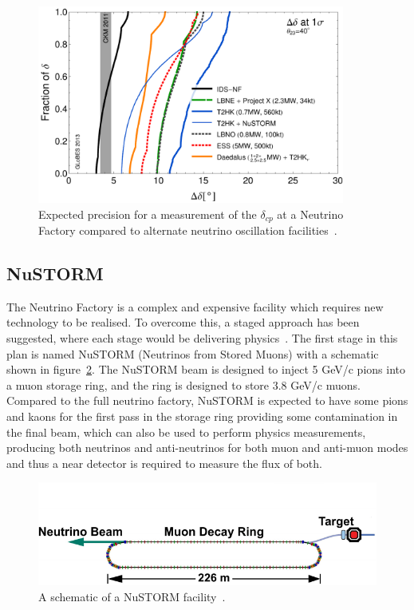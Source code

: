 \begin{figure}[h!]
\centering
\includegraphics[width=0.9\textwidth]{figures/rdr-cp-precision-comparison-131216.pdf}
\caption{Expected precision for a measurement of the $\delta_{cp}$ at a Neutrino Factory compared to alternate neutrino oscillation facilities~\cite{Fix7}.}
\label{fig:nuFactExp}
\end{figure}



\subsection{NuSTORM}\label{subsec:NuSTORM}

The Neutrino Factory is a complex and expensive facility which requires new technology to be realised. To overcome this, a staged approach has been suggested, where each stage would be delivering physics~\cite{Fix7}. The first stage in this plan is named NuSTORM (Neutrinos from Stored Muons) with a schematic shown in figure~\ref{fig:nuStorm}. The NuSTORM beam is designed to inject 5 GeV/c pions into a muon storage ring, and the ring is designed to store 3.8 GeV/c muons. Compared to the full neutrino factory, NuSTORM is expected to have some pions and kaons for the first pass in the storage ring providing some contamination in the final beam, which can also be used to perform physics measurements, producing both neutrinos and anti-neutrinos for both muon and anti-muon modes and thus a near detector is required to measure the flux of both. 

\begin{figure}[h!]
\centering
\includegraphics[width=\textwidth]{figures/nuSTORM_schematic.pdf}
\caption{A schematic of a NuSTORM facility~\cite{Fix7}.}
\label{fig:nuStorm}
\end{figure}

